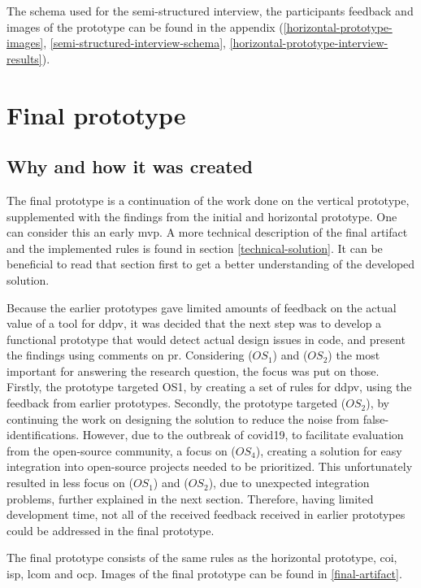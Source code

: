 \documentclass[pdftex,10pt,b5paper,twoside]{report}
\begin{document}
The schema used for the semi-structured interview, the participants feedback and images of the prototype can be found in the appendix (\ref{horizontal-prototype-images}, \ref{semi-structured-interview-schema}, \ref{horizontal-prototype-interview-results}).

\section{Final prototype}
\label{final-prototype}

\subsection*{Why and how it was created}
The final prototype is a continuation of the work done on the vertical prototype, supplemented with the findings from the initial and horizontal prototype. One can consider this an early \gls{mvp}. A more technical description of the final artifact and the implemented rules is found in section \ref{technical-solution}. It can be beneficial to read that section first to get a better understanding of the developed solution.

Because the earlier prototypes gave limited amounts of feedback on the actual value of a tool for \gls{ddpv}, it was decided that the next step was to develop a functional prototype that would detect actual design issues in code, and present the findings using comments on \gls{pr}. Considering (\(OS_{1}\)) and (\(OS_{2}\)) the most important for answering the research question, the focus was put on those. Firstly, the prototype targeted OS1, by creating a set of rules for \gls{ddpv}, using the feedback from earlier prototypes. Secondly, the prototype targeted (\(OS_{2}\)), by continuing the work on designing the solution to reduce the noise from false-identifications. However, due to the outbreak of \gls{covid19}, to facilitate evaluation from the open-source community, a focus on (\(OS_{4}\)), creating a solution for easy integration into open-source projects needed to be prioritized. This unfortunately resulted in less focus on (\(OS_{1}\)) and (\(OS_{2}\)), due to unexpected integration problems, further explained in the next section. Therefore, having limited development time, not all of the received feedback received in earlier prototypes could be addressed in the final prototype. 

The final prototype consists of the same rules as the horizontal prototype, \gls{coi}, \gls{isp}, \gls{lcom} and \gls{ocp}. Images of the final prototype can be found in \ref{final-artifact}.
\end{document}
